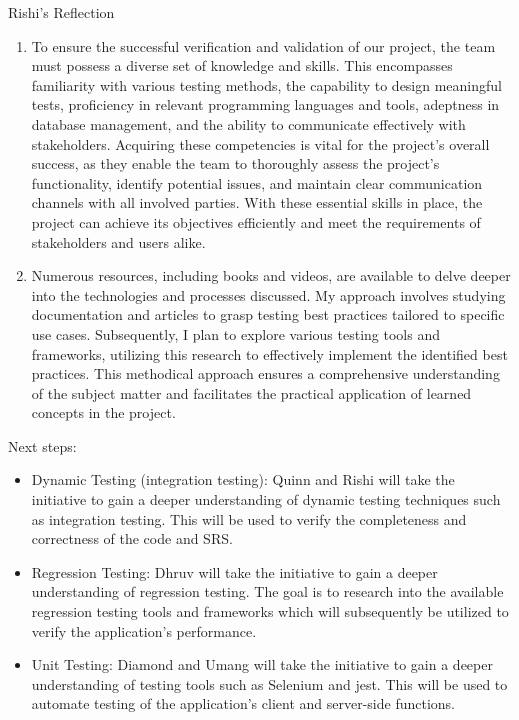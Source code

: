 \documentclass[12pt, titlepage]{article}
\begin{document}
Rishi's Reflection
\begin{enumerate}
    \item To ensure the successful verification and validation of our project, the team must possess a diverse set of knowledge and skills. This encompasses familiarity with various testing methods, the capability to design meaningful tests, proficiency in relevant programming languages and tools, adeptness in database management, and the ability to communicate effectively with stakeholders. Acquiring these competencies is vital for the project's overall success, as they enable the team to thoroughly assess the project's functionality, identify potential issues, and maintain clear communication channels with all involved parties. With these essential skills in place, the project can achieve its objectives efficiently and meet the requirements of stakeholders and users alike.

    \item Numerous resources, including books and videos, are available to delve deeper into the technologies and processes discussed. My approach involves studying documentation and articles to grasp testing best practices tailored to specific use cases. Subsequently, I plan to explore various testing tools and frameworks, utilizing this research to effectively implement the identified best practices. This methodical approach ensures a comprehensive understanding of the subject matter and facilitates the practical application of learned concepts in the project.
\end{enumerate}



Next steps:
\begin{itemize}
    \item Dynamic Testing (integration testing): Quinn and Rishi will take the initiative to gain a deeper understanding of dynamic testing techniques such as integration testing. This will be used to verify the completeness and correctness of the code and SRS.
    \item Regression Testing: Dhruv will take the initiative to gain a deeper understanding of regression testing. The goal is to research into the available regression testing tools and frameworks which will subsequently be utilized to verify the application's performance.
    \item Unit Testing: Diamond and Umang will take the initiative to gain a deeper understanding of testing tools such as Selenium and jest. This will be used to automate testing of the application's client and server-side functions.
\end{itemize}
\end{document}
